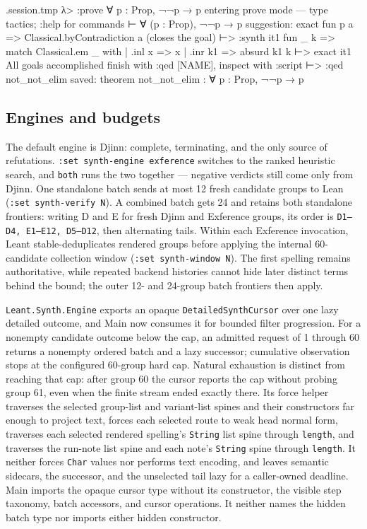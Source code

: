 \documentclass[11pt,oneside]{article}
\newcommand{\code}[1]{\texttt{#1}}
\newenvironment{session}
 {\VerbatimEnvironment\begin{VerbatimOut}{\jobname.session.tmp}}
 {\end{VerbatimOut}%
  \begin{sessionouter}%
  \VerbatimInput[fontsize=\footnotesize, breaklines=true,
    breaksymbolleft={\textcolor{stone}{\footnotesize$\hookrightarrow$}},
    formatcom=\color{ink}, tabsize=4]{\jobname.session.tmp}%
  \end{sessionouter}}
\begin{document}
\begin{session}
λ> :prove ∀ p : Prop, ¬¬p → p
entering prove mode — type tactics; :help for commands
⊢ ∀ (p : Prop), ¬¬p → p
suggestion: exact fun p a => Classical.byContradiction a  (closes the goal)
⊢> :synth
  it1  fun _ k => match Classical.em _ with | .inl x => x | .inr k1 => absurd k1 k
⊢> exact it1
All goals accomplished
finish with :qed [NAME], inspect with :script
⊢> :qed not_not_elim
saved: theorem not_not_elim : ∀ p : Prop, ¬¬p → p
\end{session}

\subsection{Engines and budgets}\label{sec:engines}

The default engine is Djinn: complete, terminating, and the only
source of refutations. \code{:set synth-engine exference} switches to
the ranked heuristic search, and \code{both} runs the two together ---
negative verdicts still come only from Djinn. One standalone batch sends at
most 12 fresh candidate groups to Lean (\code{:set synth-verify N}). A
combined batch gets 24 and
retains both standalone frontiers: writing D and E for fresh Djinn and
Exference groups, its order is \code{D1–D4, E1–E12, D5–D12}, then
alternating tails. Within each Exference invocation, Leant
stable-deduplicates rendered groups before applying the internal 60-candidate
collection window (\code{:set synth-window N}). The first spelling remains authoritative, while repeated
backend histories cannot hide later distinct terms behind the bound; the
outer 12- and 24-group batch frontiers then apply.

\code{Leant.Synth.Engine} exports an opaque \code{DetailedSynthCursor} over one
lazy detailed outcome, and Main now consumes it for bounded filter
progression.
For a nonempty candidate outcome below the cap, an admitted request of 1
through 60 returns a nonempty ordered batch and a lazy successor; cumulative
observation stops at the configured 60-group hard cap. Natural
exhaustion is distinct from reaching that cap: after group 60 the
cursor reports the cap without probing group 61, even when the finite stream
ended exactly there. Its force helper traverses the selected group-list and
variant-list spines and their constructors far enough to project text, forces
each selected route to weak head normal form, traverses each selected rendered
spelling's \code{String} list spine through \code{length}, and traverses the
run-note list spine and each note's \code{String} spine through \code{length}.
It neither forces \code{Char} values nor performs text encoding, and leaves
semantic sidecars, the successor, and the unselected tail lazy for a caller-owned
deadline. Main imports the opaque cursor type without its constructor, the
visible step taxonomy, batch accessors, and cursor operations. It neither names
the hidden batch type nor imports either hidden constructor.
\end{document}
